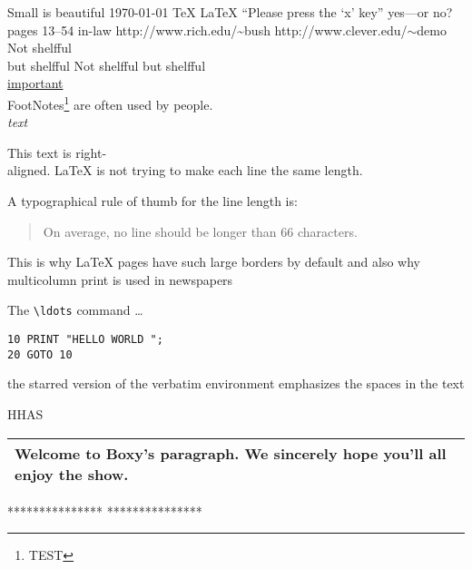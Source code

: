 \documentclass[11pt, twoside, a4paper]{article}
\author{Hong}
\begin{document}
Small is beautiful
\newline
\today
\newline 
\TeX
\newline
\LaTeX 
\newline
\LaTeXe
\newline ``Please press the `x' key''
yes---or no? pages 13--54 in-law
\newline 
\newline http://www.rich.edu/\~{}bush 
\newline http://www.clever.edu/$\sim$demo
\newline Not shelfful\\
but shelf\mbox{}ful
Not shelfful
but shelfful\\
\underline{important} \\
FootNotes\footnote{TEST} are often used by people.\\
\emph{text}

\begin{flushright}
This text is right-\\aligned. \LaTeX{} is not trying to make each
line the same length.
\end{flushright}

A typographical rule of thumb
for the line length is:
\begin{quote}
On average, no line should
be longer than 66 characters.
\end{quote}
This is why \LaTeX{} pages have
such large borders by default
and also why multicolumn print
is used in newspapers

The \verb|\ldots| command \ldots
\begin{verbatim}
10 PRINT "HELLO WORLD ";
20 GOTO 10
\end{verbatim}

\begin{verbatim*}
    the starred version of
    the verbatim
    environment emphasizes
    the spaces in the text
\end{verbatim*}



\newpage HHAS
\begin{tabular}{|p{4.7cm}|}
    \hline
    Welcome to Boxy's paragraph.
    We sincerely hope you'll
    all enjoy the show.\\
    \hline
    \end{tabular}
\newline ****************
\newline ****************
\end{document}
